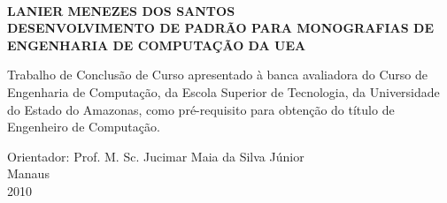 \thispagestyle{empty}
\begin{center}
	\textbf{\\[4em]LANIER MENEZES DOS SANTOS \\[5cm]}
	\textbf{DESENVOLVIMENTO DE PADR\~{A}O PARA MONOGRAFIAS DE ENGENHARIA DE COMPUTA\c{C}\~{A}O DA UEA\\[96pt]}
\end{center}
\hspace*{8cm}
\begin{minipage}{8cm} 
	Trabalho de Conclus\~{a}o de Curso apresentado \`{a} banca avaliadora do Curso de Engenharia de Computa\c{c}\~{a}o, da 
	Escola Superior de Tecnologia, da Universidade do Estado do Amazonas, como
	pr\'{e}-requisito para obten\c{c}\~{a}o do t\'{i}tulo de Engenheiro de Computa\c{c}\~{a}o.\\[50pt] 
\end{minipage} 
\begin{center}
	Orientador: Prof. M. Sc. Jucimar Maia da Silva J\'{u}nior\\[4ex]
	\normalsize Manaus\\
	\normalsize 2010
\end{center}